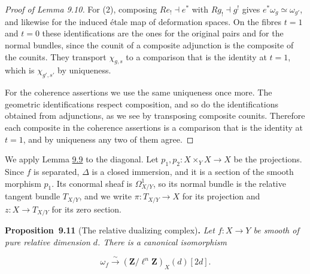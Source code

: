 \documentclass[11pt]{article}
\newenvironment{bpstatement}[2]{\par\addvspace{0.6\baselineskip}\noindent\textbf{#1}#2\textbf{.}\enspace\ignorespaces}
  {\par\addvspace{0.4\baselineskip}}
\newenvironment{bpstatementit}[2]{\begin{bpstatement}{#1}{#2}\itshape\ignorespaces}{\end{bpstatement}}
\begin{document}
\begin{proof}[{Proof of Lemma 9.10}]
For (2), composing \(Re_!\dashv e^*\) with \(Rg_!\dashv g^!\) gives \(e^*\omega_g\simeq\omega_{g'}\), and likewise for the induced étale map of deformation spaces. On the fibres \(t=1\) and \(t=0\) these identifications are the ones for the original pairs and for the normal bundles, since the counit of a composite adjunction is the composite of the counits. They transport \(\chi_{g,s}\) to a comparison that is the identity at \(t=1\), which is \(\chi_{g',s'}\) by uniqueness.

For the coherence assertions we use the same uniqueness once more. The geometric identifications respect composition, and so do the identifications obtained from adjunctions, as we see by transposing composite counits. Therefore each composite in the coherence assertions is a comparison that is the identity at \(t=1\), and by uniqueness any two of them agree.
\end{proof}

\label{bp33}%
We apply Lemma \hyperref[bp27]{9.9} to the diagonal. Let \(p_1,p_2:X\times_YX\to X\) be the projections. Since \(f\) is separated, \(\Delta\) is a closed immersion, and it is a section of the smooth morphism \(p_1\). Its conormal sheaf is \(\Omega^1_{X/Y}\), so its normal bundle is the relative tangent bundle \(T_{X/Y}\), and we write \(\pi:T_{X/Y}\to X\) for its projection and \(z:X\to T_{X/Y}\) for its zero section.

\label{bp34}%
\begin{bpstatementit}{Proposition~9.11}{ (The relative dualizing complex)}
Let \(f:X\to Y\) be smooth of pure relative dimension \(d\). There is a canonical isomorphism

\[
\omega_{f}\xrightarrow{\sim}(\mathbf Z/\ell^n\mathbf Z)_{X}(d)[2d].
\tag{9.14}
\]
\end{bpstatementit}
\end{document}
